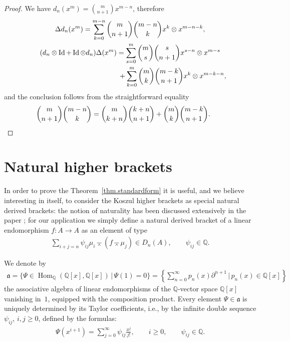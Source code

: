 \documentclass[11pt]{article}
\newcommand{\wedgebar}{\barwedge}
\newcommand{\de}{\partial}
\newcommand{\Hom}{\operatorname{Hom}}
\newcommand{\Q}{\mathbb{Q}}
\numberwithin{equation}{section}
\begin{document}
\begin{proof}
We have $d_n(x^m)=\binom{m}{n+1}x^{m-n}$, therefore
\begin{gather*}
\Delta d_n(x^m)= \sum_{k=0}^{m-n}\dbinom{m}{n+1}\binom{m-n}{k}x^k\otimes x^{m-n-k},\\
(d_n\otimes \operatorname{Id}+\operatorname{Id}\otimes d_n)\Delta(x^m)=
\sum_{s=0}^{m}\dbinom{m}{s}\binom{s}{n+1}x^{s-n}\otimes x^{m-s} \\
\hphantom{(d_n\otimes \operatorname{Id}+\operatorname{Id}\otimes d_n)\Delta(x^m)=}{} +
\sum_{k=0}^{m}\dbinom{m}{k}\binom{m-k}{n+1}x^{k}\otimes x^{m-k-n},
\end{gather*}
and the conclusion follows from the straightforward equality
\begin{gather*} \dbinom{m}{n+1}\binom{m-n}{k}=\dbinom{m}{k+n}\binom{k+n}{n+1}+
\dbinom{m}{k}\binom{m-k}{n+1} .\tag*{\qed}
\end{gather*}
\renewcommand{\qed}{}
\end{proof}
\setcounter{section}{5}
\setcounter{subsection}{0}
\setcounter{subsubsection}{0}
\setcounter{Theorem}{7}
\setcounter{equation}{0}
\section{Natural higher brackets}
\label{sec.natural}

In order to prove the Theorem~\ref{thm.standardform} it is useful, and we believe interesting in itself, to consider the Koszul higher brackets
as special natural derived brackets: the notion of naturality has been discussed extensively in the paper \cite{markl1}; for our application we simply def\/ine a natural derived bracket of a linear endomorphism $f\colon A\to A$ as an element of type
\begin{gather*}\sum_{i+j=n}\psi_{ij} \mu_i\wedgebar (f\wedgebar\mu_j)\in D_n(A),\qquad \psi_{ij}\in \Q .\end{gather*}

We denote by
\begin{gather*}
\mathfrak{a}=\big\{\Psi\in \Hom_{\Q}(\Q[x],\Q[x])\,|\, \Psi(1)=0\big\}
=\left\{\sum_{n=0}^{\infty}p_n(x)\de^{n+1}\,|\, p_n(x)\in \Q[x]\right\}\end{gather*}
the associative algebra of linear endomorphisms of the $\Q$-vector space
$\Q[x]$ vanishing in~$1$, equipped with the composition product.
Every element $\Psi\in \mathfrak{a}$ is uniquely determined by its Taylor coef\/f\/icients,
i.e., by the inf\/inite double sequence $\psi_{ij}$, $i,j\ge 0$, def\/ined by the formulas:
\begin{gather}\label{equ.taylor}
\Psi(x^{i+1})=\sum_{j=0}^{\infty}\psi_{ij}\frac{x^j}{j!},\qquad i\ge 0,\qquad \psi_{ij}\in\Q .
\end{gather}
\end{document}

